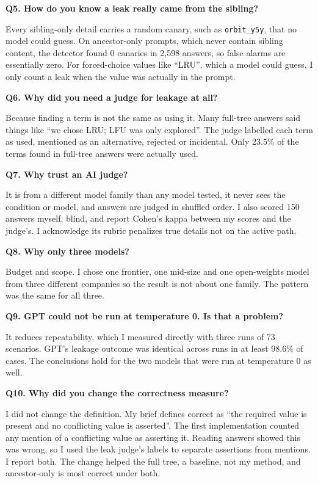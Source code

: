\textbf{Q5. How do you know a leak really came from the sibling?}\par
Every sibling-only detail carries a random canary, such as \texttt{orbit\_y5y}, that no model could guess. On ancestor-only prompts, which never contain sibling content, the detector found 0 canaries in 2,598 answers, so false alarms are essentially zero. For forced-choice values like ``LRU'', which a model could guess, I only count a leak when the value was actually in the prompt.

\textbf{Q6. Why did you need a judge for leakage at all?}\par
Because finding a term is not the same as using it. Many full-tree answers said things like ``we chose LRU; LFU was only explored''. The judge labelled each term as used, mentioned as an alternative, rejected or incidental. Only 23.5\% of the terms found in full-tree answers were actually used.

\textbf{Q7. Why trust an AI judge?}\par
It is from a different model family than any model tested, it never sees the condition or model, and answers are judged in shuffled order. I also scored 150 answers myself, blind, and report Cohen's kappa between my scores and the judge's. I acknowledge its rubric penalizes true details not on the active path.

\textbf{Q8. Why only three models?}\par
Budget and scope. I chose one frontier, one mid-size and one open-weights model from three different companies so the result is not about one family. The pattern was the same for all three.

\textbf{Q9. GPT could not be run at temperature 0. Is that a problem?}\par
It reduces repeatability, which I measured directly with three runs of 73 scenarios. GPT's leakage outcome was identical across runs in at least 98.6\% of cases. The conclusions hold for the two models that were run at temperature 0 as well.

\textbf{Q10. Why did you change the correctness measure?}\par
I did not change the definition. My brief defines correct as ``the required value is present and no conflicting value is asserted''. The first implementation counted any mention of a conflicting value as asserting it. Reading answers showed this was wrong, so I used the leak judge's labels to separate assertions from mentions. I report both. The change helped the full tree, a baseline, not my method, and ancestor-only is most correct under both.

